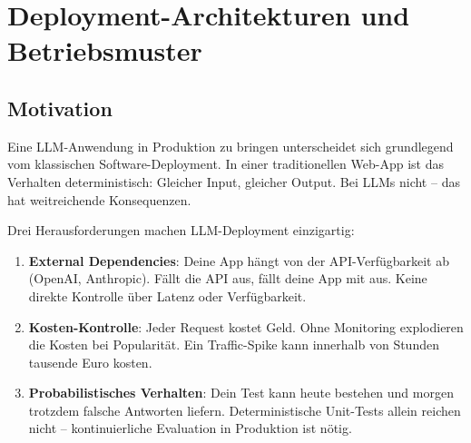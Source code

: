 \chapter{Deployment-Architekturen und Betriebsmuster}
\label{chap:deployment_architektur}


\section{Motivation}

Eine LLM-Anwendung in Produktion zu bringen unterscheidet sich grundlegend vom klassischen Software-Deployment. In einer traditionellen Web-App ist das Verhalten deterministisch: Gleicher Input, gleicher Output. Bei LLMs nicht -- das hat weitreichende Konsequenzen.

Drei Herausforderungen machen LLM-Deployment einzigartig:

\begin{enumerate}[leftmargin=*]
    \item \textbf{External Dependencies}: Deine App hängt von der API-Verfügbarkeit ab (OpenAI, Anthropic). Fällt die API aus, fällt deine App mit aus. Keine direkte Kontrolle über Latenz oder Verfügbarkeit.
    \item \textbf{Kosten-Kontrolle}: Jeder Request kostet Geld. Ohne Monitoring explodieren die Kosten bei Popularität. Ein Traffic-Spike kann innerhalb von Stunden tausende Euro kosten.
    \item \textbf{Probabilistisches Verhalten}: Dein Test kann heute bestehen und morgen trotzdem falsche Antworten liefern. Deterministische Unit-Tests allein reichen nicht -- kontinuierliche Evaluation in Produktion ist nötig.
\end{enumerate}


